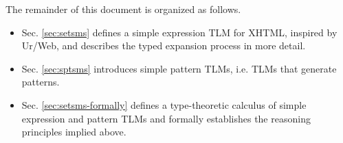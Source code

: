 \documentclass[acmsmall,10pt,review,anonymous]{acmart}\settopmatter{printfolios=true}
\begin{document}
The remainder of this document is organized as follows.
\begin{itemize}
\item Sec. \ref{sec:setsms} defines a {simple expression TLM} for XHTML, inspired by Ur/Web, and describes the typed expansion process in more detail.
\item Sec. \ref{sec:sptsms} introduces {simple pattern TLMs}, i.e. TLMs that generate patterns. %
\item Sec. \ref{sec:setsms-formally} defines a type-theoretic calculus of simple expression and pattern TLMs and formally establishes the reasoning principles implied above.



\end{itemize}
\end{document}
